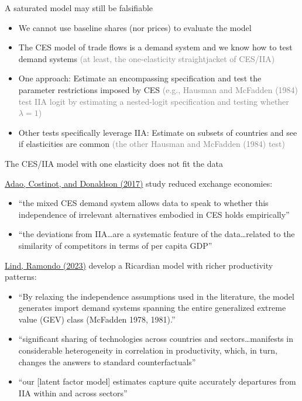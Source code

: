 \documentclass[11pt,notes=hide,aspectratio=169]{beamer}
\begin{document}
\begin{frame}{A saturated model may still be falsifiable}
\begin{itemize}
\item We cannot use baseline shares (nor prices) to evaluate the model
\item The CES model of trade flows is a demand system and we know how to test demand systems
\textcolor{gray}{(at least, the one-elasticity straightjacket of CES/IIA)}
\item One approach: Estimate an encompassing specification and test the parameter restrictions imposed by CES
\textcolor{gray}{(e.g., Hausman and McFadden (1984) test IIA logit by estimating a nested-logit specification and testing whether $\lambda = 1$)}
\item Other tests specifically leverage IIA:
Estimate on subsets of countries and see if elasticities are common
\textcolor{gray}{(the other Hausman and McFadden (1984) test)}
\end{itemize}
\end{frame}
\begin{frame}{The CES/IIA model with one elasticity does not fit the data}
{\small
\href{https://www.aeaweb.org/articles?id=10.1257/aer.20150956}{Adao, Costinot, and Donaldson (2017)} study reduced exchange economies:
\begin{itemize}
\item ``the mixed CES demand system allows data to speak to whether this independence of irrelevant alternatives embodied in CES holds empirically''
\item ``the deviations from IIA\dots are a systematic feature of the data\dots related to the similarity of competitors in terms of per capita GDP''
\end{itemize}
\href{https://www.aeaweb.org/articles?id=10.1257/aer.20190781}{Lind, Ramondo (2023)} develop a Ricardian model with richer productivity patterns:
\begin{itemize}
\item ``By relaxing the independence assumptions used in the literature, the model generates import demand systems spanning the entire generalized extreme value (GEV) class (McFadden 1978, 1981).''
\item ``significant sharing of technologies across countries and sectors\dots manifests in considerable heterogeneity in correlation in productivity, which, in turn, changes the answers to standard counterfactuals''
\item ``our [latent factor model] estimates capture quite accurately departures from IIA within and across sectors''
\end{itemize}
}\end{frame}
\end{document}
